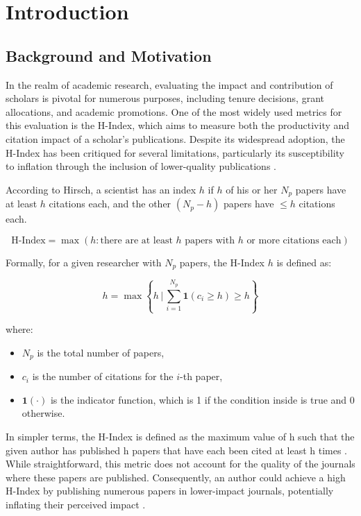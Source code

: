\chapter{Introduction}
\label{ch:intro}

\section{Background and Motivation}
In the realm of academic research, evaluating the impact and contribution of
scholars is pivotal for numerous purposes, including tenure decisions, grant
allocations, and academic promotions. One of the most widely used metrics for
this evaluation is the H-Index, which aims to measure both the productivity and
citation impact of a scholar’s publications. Despite its widespread adoption,
the H-Index has been critiqued for several limitations, particularly its
susceptibility to inflation through the inclusion of lower-quality publications
\cite{costas2007h, tonta2020monetary}.

According to Hirsch, a scientist has an index \( h \) if \( h \) of his or her
\( N_p \) papers have at least \( h \) citations each, and the other \( (N_p -
h) \) papers have \(\leq h \) citations each.

\[
      \text{H-Index} = \max \left( h : \text{there are at least } h \text{ papers with } h \text{ or more citations each} \right)
\]

Formally, for a given researcher with \( N_p \) papers, the H-Index \( h \) is
defined as:

\[
      h = \max \left\{ h \, \Bigg| \, \sum_{i=1}^{N_p} \mathbf{1} (c_i \geq h) \geq h \right\}
\]

where:
\begin{itemize}
      \item \( N_p \) is the total number of papers,
      \item \( c_i \) is the number of citations for the \( i \)-th paper,
      \item \( \mathbf{1}(\cdot) \) is the indicator function, which is 1 if the condition inside is true and 0 otherwise.
\end{itemize} In simpler terms, the H-Index is defined as the maximum value of h
such that the given author has published h papers that have each been cited at least h times \cite{hirsch2005index}.
While straightforward, this metric does not account for the quality of the journals where
these papers are published. Consequently, an author could achieve a high H-Index
by publishing numerous papers in lower-impact journals, potentially inflating their perceived impact \cite{tonta2020monetary}.

